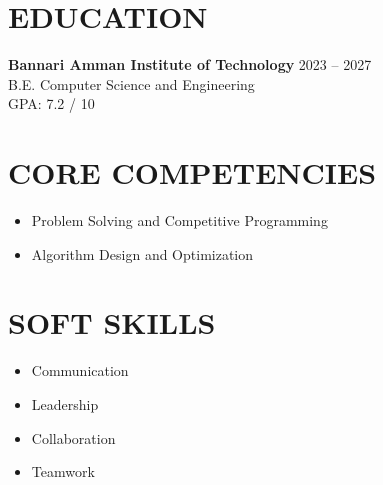 \documentclass[letterpaper,11pt]{article}
\begin{document}
\vspace{6pt}

\section{EDUCATION}
\textbf{Bannari Amman Institute of Technology} \hfill 2023 -- 2027 \\
B.E. Computer Science and Engineering \\
GPA: 7.2 / 10

\section{CORE COMPETENCIES}
\begin{itemize}
\item Problem Solving and Competitive Programming
\item Algorithm Design and Optimization
\end{itemize}

\section{SOFT SKILLS}
\begin{itemize}[itemsep=6pt]
\item Communication 
\item Leadership
\item Collaboration
\item Teamwork
\end{itemize}
\end{document}
